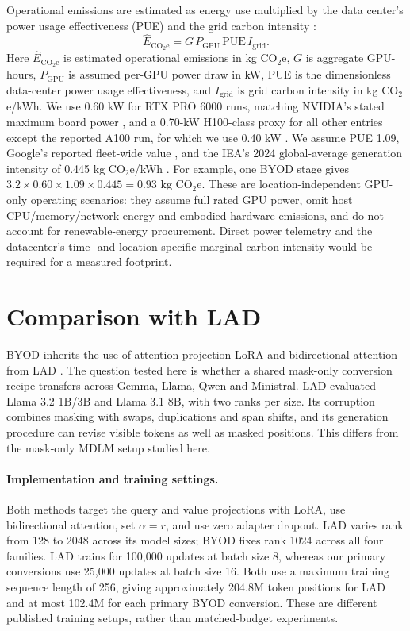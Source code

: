 \documentclass{article}
\newcommand{\method}{BYOD}
\begin{document}
Operational emissions are estimated as energy use multiplied by the data center's power usage effectiveness (PUE) and the grid carbon intensity \citep{lannelongue2021green,patterson2021carbon}:
\begin{equation}
\widehat{E}_{\mathrm{CO_2e}}=G\,P_{\mathrm{GPU}}\,\mathrm{PUE}\,I_{\mathrm{grid}}.
\end{equation}
Here $\widehat{E}_{\mathrm{CO_2e}}$ is estimated operational emissions in kg CO$_2$e, $G$ is aggregate GPU-hours, $P_{\mathrm{GPU}}$ is assumed per-GPU power draw in kW, PUE is the dimensionless data-center power usage effectiveness, and $I_{\mathrm{grid}}$ is grid carbon intensity in kg CO$_2$e/kWh. We use 0.60 kW for RTX PRO 6000 runs, matching NVIDIA's stated maximum board power \citep{nvidiaRTXPro6000}, and a 0.70-kW H100-class proxy for all other entries except the reported A100 run, for which we use 0.40 kW \citep{nvidiaH100,nvidiaA100}. We assume PUE 1.09, Google's reported fleet-wide value \citep{googlePUE2025}, and the IEA's 2024 global-average generation intensity of 0.445 kg CO$_2$e/kWh \citep{ieaElectricity2025}. For example, one BYOD stage gives $3.2\times0.60\times1.09\times0.445=0.93$ kg CO$_2$e. These are location-independent GPU-only operating scenarios: they assume full rated GPU power, omit host CPU/memory/network energy and embodied hardware emissions, and do not account for renewable-energy procurement. Direct power telemetry and the datacenter's time- and location-specific marginal carbon intensity would be required for a measured footprint.

\section{Comparison with LAD}
\label{app:lad-comparison}

\method{} inherits the use of attention-projection LoRA and bidirectional attention from LAD \citep{kuiper2025lad}. The question tested here is whether a shared mask-only conversion recipe transfers across Gemma, Llama, Qwen and Ministral. LAD evaluated Llama 3.2 1B/3B and Llama 3.1 8B, with two ranks per size. Its corruption combines masking with swaps, duplications and span shifts, and its generation procedure can revise visible tokens as well as masked positions. This differs from the mask-only MDLM setup studied here.

\paragraph{Implementation and training settings.} Both methods target the query and value projections with LoRA, use bidirectional attention, set $\alpha=r$, and use zero adapter dropout. LAD varies rank from 128 to 2048 across its model sizes; \method{} fixes rank 1024 across all four families. LAD trains for 100,000 updates at batch size 8, whereas our primary conversions use 25,000 updates at batch size 16. Both use a maximum training sequence length of 256, giving approximately 204.8M token positions for LAD and at most 102.4M for each primary BYOD conversion. These are different published training setups, rather than matched-budget experiments.
\end{document}
